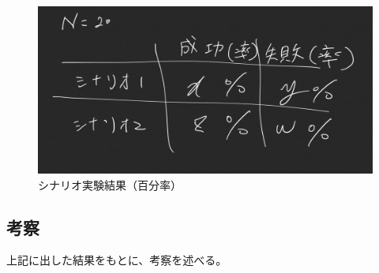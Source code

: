 \begin{figure}[htbp]
  \caption{シナリオ実験結果（百分率）}
  \label{fig:notify_success_failure_rate}
  \begin{center}
    \includegraphics[bb=0 0 1000 450,width=20cm]{assets/notify_success_failure_rate.png}
  \end{center}
\end{figure}

\subsection{考察}

上記に出した結果をもとに、考察を述べる。

